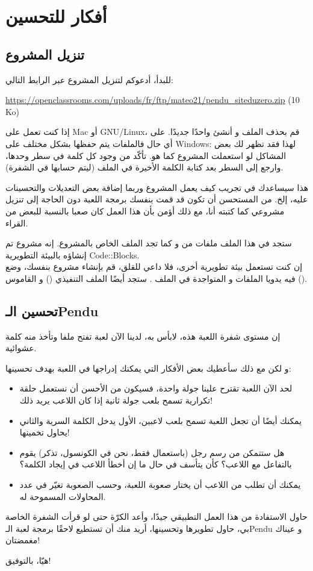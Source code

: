 \section*{أفكار للتحسين}

\subsection{تنزيل المشروع}

للبدأ، أدعوكم لتنزيل المشروع عبر الرابط التالي:

\url{https://openclassrooms.com/uploads/fr/ftp/mateo21/pendu_siteduzero.zip} \textenglish{(10 Ko)}

إذا كنت تعمل على
\textenglish{Mac}
	أو
\textenglish{GNU/Linux}،
	 قم بحذف الملف
و أنشئ واحدًا جديدًا. على أي حال فالملفات يتم حفظها بشكل مختلف على
\textenglish{Windows}:
 لهذا فقد تظهر لك بعض المشاكل لو استعملت المشروع كما هو. تأكّد من وجود كل كلمة في سطر وحدها، وارجع إلى السطر بعد كتابة الكلمة الأخيرة في الملف (ليتم حسابها في الشفرة).

هذا سيساعدك في تجريب كيف يعمل المشروع وربما إضافة بعض التعديلات والتحسينات عليه، إلخ. من المستحسن أن تكون قد قمت بنفسك برمجة اللعبة دون الحاجة إلى تنزيل مشروعي كما كتبته أنا، مع ذلك أؤمن بأن هذا العمل كان صعبا بالنسبة للبعض من القراء.

ستجد في هذا الملف
ملفات من
 و
كما تجد الملف
الخاص بالمشروع. إنه مشروع تم إنشاؤه بالبيئة التطويرية
\textenglish{Code::Blocks}.\\
إن كنت تستعمل بيئة تطويرية أخرى، فلا داعي للقلق، قم بإنشاء مشروع بنفسك، وضع فيه يدويا الملفات
و
المتواجدة في الملف
.
ستجد أيضًا الملف التنفيذي
()
و القاموس
().

\subsection{تحسين الـ\textenglish{Pendu}}

إن مستوى شفرة اللعبة هذه، لابأس به، لدينا الآن لعبة تفتح ملفا وتأخذ منه كلمة عشوائية.

و لكن مع ذلك سأعطيك بعض الأفكار التي يمكنك إدراجها في اللعبة بهدف تحسينها:

\begin{itemize}
  \item لحد الآن اللعبة تقترح علينا جولة واحدة، فسيكون من الأحسن أن نستعمل حلقة تكرارية تسمح بلعب جولة ثانية إذا كان اللاعب يريد ذلك!
  \item يمكنك أيضًا أن تجعل اللعبة تسمح بلعب لاعبين، الأول يدخل الكلمة السرية والثاني يحاول تخمينها!
  \item هل ستتمكن من رسم رجل (باستعمال 
 فقط، نحن في الكونسول، تذكر) يقوم بالتفاعل مع اللاعب؟ كأن يتأسف في حال ما إن أخطأ اللاعب في إيجاد الكلمة؟
  \item يمكنك أن تطلب من اللاعب أن يختار صعوبة اللعبة، وحسب الصعوبة تغيّر في عدد المحاولات المسموحة له.
\end{itemize}

حاول الاستفادة من هذا العمل التطبيقي جيدًا، وأعد الكرّة حتى لو قرأت الشفرة الخاصة بي، حاول تطويرها وتحسينها، أريد منك أن تستطيع لاحقًا برمجة لعبة الـ\textenglish{Pendu}
و عيناك مغمضتان!

هيّا، بالتوفيق!
